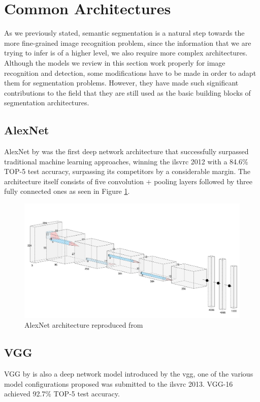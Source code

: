 \section{Common Architectures}
\label{sec:architectures}
As we previously stated, semantic segmentation is a natural step towards the more fine-grained image recognition problem, since the information that we are trying to infer is of a higher level, we also require more complex architectures. Although the models we review in this section work properly for image recognition and detection, some modifications have to be made in order to adapt them for segmentation problems. However, they have made such significant contributions to the field that they are still used as the basic building blocks of segmentation architectures.

\subsection{AlexNet}
AlexNet by \cite{AlexNet} was the first deep network architecture that successfully surpassed traditional machine learning approaches, winning the \gls{ilsvrc} 2012 with a 84.6\% TOP-5 test accuracy, surpassing its competitors by a considerable margin. The architecture itself consists of five convolution + pooling layers followed by three fully connected ones as seen in Figure \ref{alexnet}.

\begin{figure}[h]
	\includegraphics[scale=0.3]{archivos/alexnet.png}
	\centering
	\caption{AlexNet architecture reproduced from \cite{AlexNet}}
	\label{alexnet}
\end{figure}

\subsection{VGG}
VGG by \cite{DBLP:journals/corr/SimonyanZ14a} is also a deep network model introduced by the \gls{vgg}, one of the various model configurations proposed was submitted to the \gls{ilsvrc} 2013. VGG-16 achieved 92.7\% TOP-5 test accuracy.

